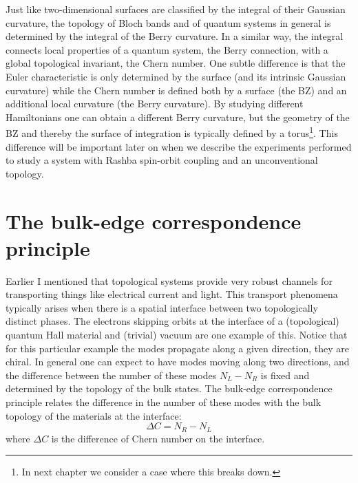 Just like two-dimensional surfaces are classified by the integral of their Gaussian curvature, the topology of Bloch bands and of quantum systems in general is determined by the integral of the Berry curvature. In a similar way, the integral connects local properties of a quantum system, the Berry connection, with a global topological invariant, the Chern number. One subtle difference is that the Euler characteristic is only determined by the surface (and its intrinsic Gaussian curvature) while the Chern number is defined both by a surface (the BZ) and an additional local curvature (the Berry curvature). By studying different Hamiltonians one can obtain a different Berry curvature, but the geometry of the BZ and thereby the surface of integration is typically defined by a torus\footnote{In next chapter we consider a case where this breaks down.}. This difference will be important later on when we describe the experiments performed to study a system with Rashba spin-orbit coupling and an unconventional topology. %


\section{The bulk-edge correspondence principle}

Earlier I mentioned that topological systems provide very robust channels for transporting things like electrical current and light. This transport phenomena typically arises when there is a spatial interface between two topologically distinct phases. The electrons skipping orbits at the interface of a (topological) quantum Hall material and (trivial) vacuum are one example of this. Notice that for this particular example the modes propagate along a given direction, they are chiral. In general one can expect to have modes moving along two directions, and the difference between the number of these modes $N_L - N_R$ is fixed and determined by the topology of the bulk states. The bulk-edge correspondence principle relates the difference in the number of these modes with the bulk topology of the materials at the interface:
%
\begin{equation}
	\Delta C=N_R - N_L
\end{equation}
%
where $\Delta C$ is the difference of Chern number on the interface. 

